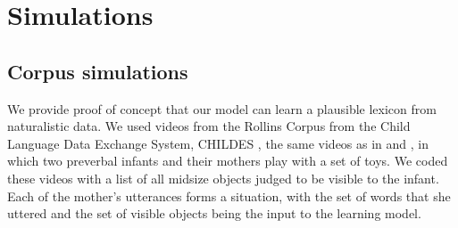 \documentclass[man,noapacite,12pt]{apa2}
\newcommand{\vect}[1]{\accentset{\rightharpoonup}{#1}}
\begin{document}
 




%
%
%
%
%
%

\section{Simulations}

\subsection{Corpus simulations}

We provide proof of concept that our model can learn a plausible lexicon from naturalistic data. We used videos from the Rollins Corpus from the Child Language Data Exchange System, CHILDES \cite{macwhinney2000}, the same videos as in \cite{yu2007} and \cite{frank2009}, in which two preverbal infants and their mothers play with a set of toys. We coded these videos with a list of all midsize objects judged to be visible to the infant. Each of the mother's utterances forms a situation, with the set of words that she uttered and the set of visible objects being the input to the learning model.
\end{document}
